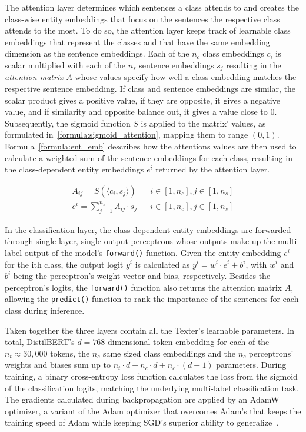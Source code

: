 The attention layer determines which sentences a class attends to and creates the class-wise entity embeddings that focus on the sentences the respective class attends to the most. To do so, the attention layer keeps track of learnable class embeddings that represent the classes and that have the same embedding dimension as the sentence embeddings. Each of the $n_c$ class embeddings $c_i$ is scalar multiplied with each of the $n_s$ sentence embeddings $s_j$ resulting in the \emph{attention matrix} $A$ whose values specify how well a class embedding matches the respective sentence embedding. If class and sentence embeddings are similar, the scalar product gives a positive value, if they are opposite, it gives a negative value, and if similarity and opposite balance out, it gives a value close to 0. Subsequently, the sigmoid function $S$ is applied to the matrix' values, as formulated in~\ref{formula:sigmoid_attention}, mapping them to range $(0, 1)$. Formula~\ref{formula:ent_emb} describes how the attentions values are then used to calculate a weighted sum of the sentence embeddings for each class, resulting in the class-dependent entity embeddings $e^i$ returned by the attention layer.

\begin{align}
    A_{ij} = S(\langle c_i , s_j \rangle) && i \in [1, n_c], j \in [1, n_s]
    \label{formula:sigmoid_attention} \\
    e^i = \sum_{j = 1}^{n_s} A_{ij} \cdot s_j && i \in [1, n_c], j \in [1, n_s]
    \label{formula:ent_emb}
\end{align}

In the classification layer, the class-dependent entity embeddings are forwarded through single-layer, single-output perceptrons whose outputs make up the multi-label output of the model's \lstinline{forward()} function. Given the entity embedding $e^i$ for the ith class, the output logit $y^i$ is calculated as $y^i = w^i \cdot e^i + b^i$, with $w^i$ and $b^i$ being the perceptron's weight vector and bias, respectively. Besides the perceptron's logits, the \lstinline{forward()} function also returns the attention matrix $A$, allowing the \lstinline{predict()} function to rank the importance of the sentences for each class during inference.

Taken together the three layers contain all the Texter's learnable parameters. In total, DistilBERT's $d = 768$ dimensional token embedding for each of the $n_t \approx 30,000$ tokens, the $n_c$ same sized class embeddings and the $n_c$ perceptrons' weights and biases sum up to $n_t \cdot d + n_c \cdot d + n_c \cdot (d + 1)$ parameters. During training, a binary cross-entropy loss function calculates the loss from the sigmoid of the classification logits, matching the underlying multi-label classification task. The gradients calculated during backpropagation are applied by an AdamW optimizer, a variant of the Adam optimizer that overcomes Adam's that keeps the training speed of Adam while keeping SGD's superior ability to generalize~\cite{Loshchilov2019DecoupledWD}.

